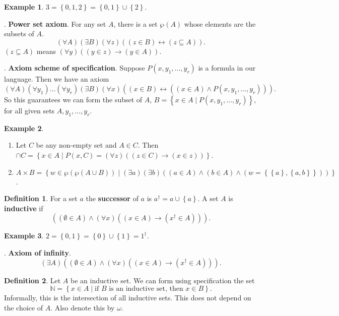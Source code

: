 \documentclass{article}
\newcommand{\N}{\mathbb{N}}
\newcommand{\rb}[1]{\left( #1 \right)}
\newcommand{\cb}[1]{\left\{ #1 \right\}}
\newcommand{\andb}[2]{\rb{#1 \land #2}}
\newcommand{\impb}[2]{\rb{#1 \rightarrow #2}}
\newcommand{\iffb}[2]{\rb{#1 \leftrightarrow #2}}
\newcommand{\fab}[1]{\rb{\forall #1}}
\newcommand{\teb}[1]{\rb{\exists #1}}
\newcommand{\eqb}[2]{\rb{#1 = #2}}
\newcommand{\inb}[2]{\rb{#1 \in #2}}
\newcommand{\subb}[2]{\rb{#1 \subseteq #2}}
\theoremstyle{definition}\newtheorem{definition}{Definition}[subsection]
\theoremstyle{definition}\newtheorem{remark}[definition]{Remark}
\theoremstyle{definition}\newtheorem*{example}{Example}
\theoremstyle{definition}\newtheorem*{note}{Note}
\begin{document}
\begin{example}
$ 3 = \cb{0, 1, 2} = \cb{0, 1} \cup \cb{2} $.
\end{example}

. \textbf{Power set axiom}. For any set $ A $, there is a set $ \wp\rb{A} $ whose elements are the subsets of $ A $.
$$ \fab{A}\teb{B}\fab{z}\iffb{\inb{z}{B}}{\subb{z}{A}}. $$
$ \subb{z}{A} $ means $ \fab{y}\impb{\inb{y}{z}}{\inb{y}{A}} $.

. \textbf{Axiom scheme of specification}. Suppose $ P\rb{x, y_1, \dots, y_r} $ is a formula in our language. Then we have an axiom
$$ \fab{A}\fab{y_1} \dots \fab{y_r}\teb{B}\fab{x}\iffb{\inb{x}{B}}{\andb{\inb{x}{A}}{P\rb{x, y_1, \dots, y_r}}}. $$
So this guarantees we can form the subset of $ A $, $ B = \cb{x \in A \mid P\rb{x, y_1, \dots, y_r}} $, for all given sets $ A, y_1, \dots, y_r $.

\begin{example}
\hfill
\begin{enumerate}
\item Let $ C $ be any non-empty set and $ A \in C $. Then $ \cap C = \cb{x \in A \mid P\rb{x, C} = \fab{z}\impb{\inb{z}{C}}{\inb{x}{z}}} $.
\item $ A \times B = \cb{w \in \wp\rb{\wp\rb{A \cup B}} \mid \teb{a}\teb{b}\rb{\inb{a}{A} \land \inb{b}{A} \land \eqb{w}{\cb{\cb{a}, \cb{a, b}}}}} $.
\end{enumerate}
\end{example}

\begin{definition}
For a set $ a $ the \textbf{successor} of $ a $ is $ a^\dagger = a \cup \cb{a} $. A set $ A $ is \textbf{inductive} if
$$ \andb{\inb{\emptyset}{A}}{\fab{x}\impb{\inb{x}{A}}{\inb{x^\dagger}{A}}}. $$
\end{definition}

\begin{example}
$ 2 = \cb{0, 1} = \cb{0} \cup \cb{1} = 1^\dagger $.
\end{example}

. \textbf{Axiom of infinity}.
$$ \teb{A}\andb{\inb{\emptyset}{A}}{\fab{x}\impb{\inb{x}{A}}{\inb{x^\dagger}{A}}}. $$

\begin{definition}
Let $ A $ be an inductive set. We can form using specification the set
$$ \N = \cb{x \in A \mid \text{if } B \text{ is an inductive set, then } x \in B}. $$
Informally, this is the intersection of all inductive sets. This does not depend on the choice of $ A $. Also denote this by $ \omega $.
\end{definition}
\end{document}

